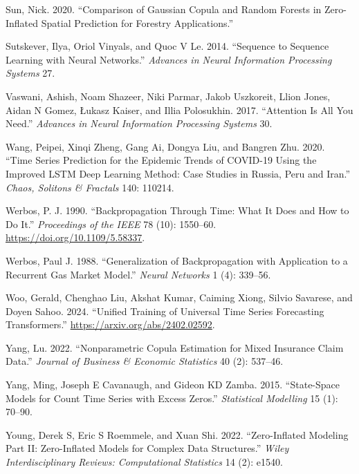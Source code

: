 \documentclass[
  letterpaper,
  double,
  12pt,
  1.0in]{beavtex}
\newlength{\cslhangindent}
\newenvironment{CSLReferences}[2] %
 {\begin{list}{}{%
  \setlength{\itemindent}{0pt}
  \setlength{\leftmargin}{0pt}
  \setlength{\parsep}{0pt}
  \ifodd #1
   \setlength{\leftmargin}{\cslhangindent}
   \setlength{\itemindent}{-1\cslhangindent}
  \fi
  \setlength{\itemsep}{#2\baselineskip}}}
 {\end{list}}
\begin{document}
\begin{CSLReferences}{1}{0}
Sun, Nick. 2020. {``Comparison of Gaussian Copula and Random Forests in
Zero-Inflated Spatial Prediction for Forestry Applications.''}

Sutskever, Ilya, Oriol Vinyals, and Quoc V Le. 2014. {``Sequence to
Sequence Learning with Neural Networks.''} \emph{Advances in Neural
Information Processing Systems} 27.

Vaswani, Ashish, Noam Shazeer, Niki Parmar, Jakob Uszkoreit, Llion
Jones, Aidan N Gomez, Łukasz Kaiser, and Illia Polosukhin. 2017.
{``Attention Is All You Need.''} \emph{Advances in Neural Information
Processing Systems} 30.

Wang, Peipei, Xinqi Zheng, Gang Ai, Dongya Liu, and Bangren Zhu. 2020.
{``Time Series Prediction for the Epidemic Trends of COVID-19 Using the
Improved LSTM Deep Learning Method: Case Studies in Russia, Peru and
Iran.''} \emph{Chaos, Solitons \& Fractals} 140: 110214.

Werbos, P. J. 1990. {``Backpropagation Through Time: What It Does and
How to Do It.''} \emph{Proceedings of the IEEE} 78 (10): 1550--60.
\url{https://doi.org/10.1109/5.58337}.

Werbos, Paul J. 1988. {``Generalization of Backpropagation with
Application to a Recurrent Gas Market Model.''} \emph{Neural Networks} 1
(4): 339--56.

Woo, Gerald, Chenghao Liu, Akshat Kumar, Caiming Xiong, Silvio Savarese,
and Doyen Sahoo. 2024. {``Unified Training of Universal Time Series
Forecasting Transformers.''} \url{https://arxiv.org/abs/2402.02592}.

Yang, Lu. 2022. {``Nonparametric Copula Estimation for Mixed Insurance
Claim Data.''} \emph{Journal of Business \& Economic Statistics} 40 (2):
537--46.

Yang, Ming, Joseph E Cavanaugh, and Gideon KD Zamba. 2015.
{``State-Space Models for Count Time Series with Excess Zeros.''}
\emph{Statistical Modelling} 15 (1): 70--90.

Young, Derek S, Eric S Roemmele, and Xuan Shi. 2022. {``Zero-Inflated
Modeling Part II: Zero-Inflated Models for Complex Data Structures.''}
\emph{Wiley Interdisciplinary Reviews: Computational Statistics} 14 (2):
e1540.


\end{CSLReferences}
\end{document}

